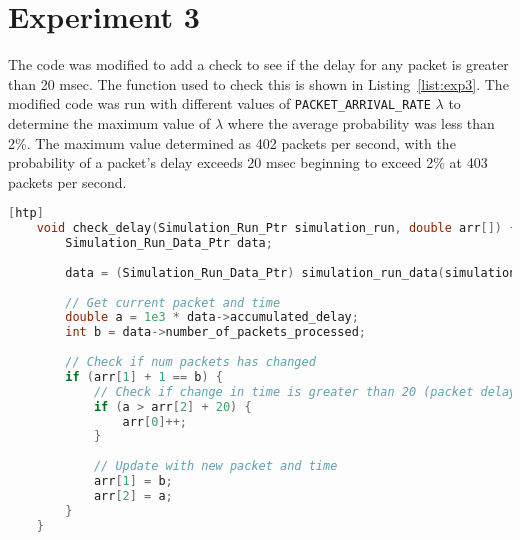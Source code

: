 \section*{Experiment 3}

The code was modified to add a check to see if the delay for any packet is greater than 20 msec. The function used to check this is shown in Listing~\ref{list:exp3}. The modified code was run with different values of \texttt{PACKET\_ARRIVAL\_RATE} $\lambda$ to determine the maximum value of $\lambda$ where the average probability was less than 2\%. The maximum value determined as 402 packets per second, with the probability of a packet's delay exceeds 20 msec beginning to exceed 2\% at 403 packets per second.

\begin{lstlisting}[language=C, caption={Modifications to Experiment 3 Code}, label={list:exp3}][htp]
    void check_delay(Simulation_Run_Ptr simulation_run, double arr[]) {
        Simulation_Run_Data_Ptr data;
    
        data = (Simulation_Run_Data_Ptr) simulation_run_data(simulation_run);
    
        // Get current packet and time
        double a = 1e3 * data->accumulated_delay;
        int b = data->number_of_packets_processed;
    
        // Check if num packets has changed
        if (arr[1] + 1 == b) {
            // Check if change in time is greater than 20 (packet delay > 20 msec)
            if (a > arr[2] + 20) {
                arr[0]++;
            }
    
            // Update with new packet and time
            arr[1] = b;
            arr[2] = a;
        }
    }
\end{lstlisting}